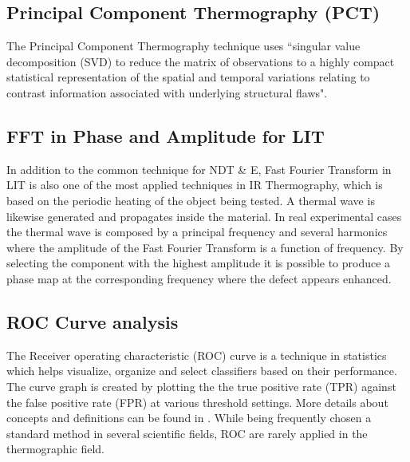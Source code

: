 \subsection{Principal Component Thermography (PCT)}
The Principal Component Thermography technique\citet{Rajic2002} uses ``singular value decomposition (SVD) to reduce the matrix of observations to a highly compact statistical representation of the spatial and temporal variations relating to contrast information associated with underlying structural flaws".

\subsection{FFT in Phase and Amplitude for LIT}
In addition to the common technique for NDT \& E, Fast Fourier Transform in LIT\citet{wu1998lock} is also one of the most applied techniques in IR Thermography, which is based on the periodic heating of the object being tested. A thermal wave is likewise generated and propagates inside the material. In real experimental cases the thermal wave is composed by a principal frequency and several harmonics where the amplitude of the Fast Fourier Transform is a function of frequency. By selecting the component with the highest amplitude it is possible to produce a phase map at the corresponding frequency where the defect appears enhanced.


\subsection{ROC Curve analysis} %
\label{sub:roc_curve_analysis}
The Receiver operating characteristic (ROC) curve is a technique in statistics which helps visualize, organize and select classifiers based on their performance. The curve graph is created by plotting the the true positive rate (TPR) against the false positive rate (FPR) at various threshold settings. More details about concepts and definitions can be found in \citet{Fawcett2006}. While being frequently chosen a standard method in several scientific fields, ROC are rarely applied in the thermographic field.\citet{Bison2014a} 

